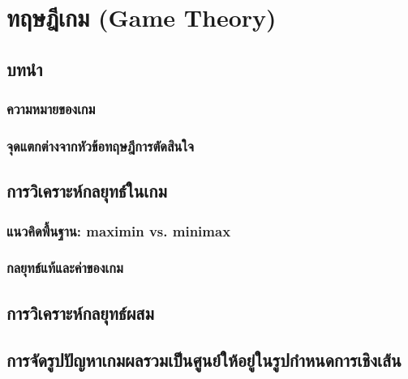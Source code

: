 \chapter{ทฤษฎีเกม (Game Theory)}

\section{บทนำ}
\subsection{ความหมายของเกม}
\subsection{จุดแตกต่างจากหัวข้อทฤษฎีการตัดสินใจ}

\section{การวิเคราะห์กลยุทธ์ในเกม}
\subsection{แนวคิดพื้นฐาน: maximin vs. minimax}
\subsection{กลยุทธ์แท้และค่าของเกม}

\section{การวิเคราะห์กลยุทธ์ผสม}

\newpage


\section{การจัดรูปปัญหาเกมผลรวมเป็นศูนย์ให้อยู่ในรูปกำหนดการเชิงเส้น}